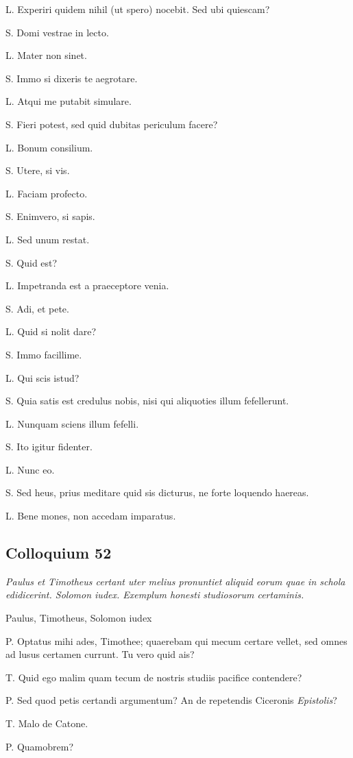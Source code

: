 \documentclass{article}
\begin{document}
L. Experiri quidem nihil (ut spero) nocebit. Sed ubi quiescam?

S. Domi vestrae in lecto. 

L. Mater non sinet. 

S. Immo si dixeris te aegrotare. 

L. Atqui me putabit simulare. 

S. Fieri potest, sed quid dubitas periculum facere?

L. Bonum consilium. 

S. Utere, si vis. 

L. Faciam profecto. 

S. Enimvero, si sapis. 

L. Sed unum restat. 

S. Quid est?

L. Impetranda est a praeceptore venia. 

S. Adi, et pete. 

L. Quid si nolit dare?

S. Immo facillime. 

L. Qui scis istud?

S. Quia satis est credulus nobis, nisi qui aliquoties illum fefellerunt. 

L. Nunquam sciens illum fefelli. 

S. Ito igitur fidenter. 

L. Nunc eo. 

S. Sed heus, prius meditare quid sis dicturus, ne forte loquendo haereas. 

L. Bene mones, non accedam imparatus. 

\subsection{Colloquium 52}
\emph{Paulus et Timotheus certant uter melius pronuntiet aliquid eorum quae in schola edidicerint. Solomon iudex. Exemplum honesti studiosorum certaminis.}

Paulus, Timotheus, Solomon iudex

P. Optatus mihi ades, Timothee; quaerebam qui mecum certare vellet, sed omnes ad lusus certamen currunt. Tu vero quid ais?

T. Quid ego malim quam tecum de nostris studiis pacifice contendere?

P. Sed quod petis certandi argumentum? An de repetendis Ciceronis \emph{Epistolis}?

T. Malo de Catone. 

P. Quamobrem?
\end{document}
